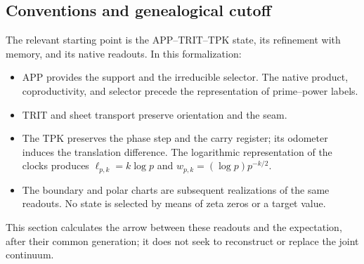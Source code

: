 \subsection{Conventions and genealogical cutoff}
\label{gamma-add-sub-32}

The relevant starting point is the APP--TRIT--TPK state, its refinement with memory, and its native readouts. In this formalization:

\begin{itemize}
\item APP provides the support and the irreducible selector. The native product, coproductivity, and selector precede the representation of prime--power labels.
\item TRIT and sheet transport preserve orientation and the seam.
\item The TPK preserves the phase step and the carry register; its odometer induces the translation difference. The logarithmic representation of the clocks produces \(\ell_{p,k}=k\log p\) and \(w_{p,k}=(\log p)p^{-k/2}\).
\item The boundary and polar charts are subsequent realizations of the same readouts. No state is selected by means of zeta zeros or a target value.

\end{itemize}
This section calculates the arrow between these readouts and the expectation, after their common generation; it does not seek to reconstruct or replace the joint continuum.

